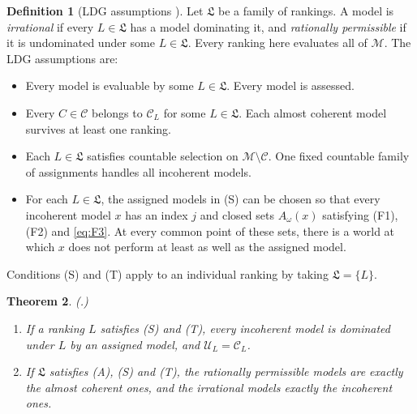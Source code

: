 \documentclass[11pt]{article}
\newtheorem{theorem}{Theorem}[section]
\theoremstyle{definition}
\newtheorem{definition}[theorem]{Definition}
\newcommand{\M}{\mathcal M}
\newcommand{\C}{\mathcal C}
\newcommand{\U}{\mathcal U}
\newcommand{\Lf}{\mathfrak L}
\begin{document}
\begin{definition}[LDG assumptions {\cite{LDG}}]\label{def:LDGassumptions}
Let $\Lf$ be a family of rankings. A model is \emph{irrational} if every $L\in\Lf$ has a model dominating it, and \emph{rationally permissible} if it is undominated under some $L\in\Lf$. Every ranking here evaluates all of $\M$. The LDG assumptions are:
\begin{itemize}[leftmargin=3.4em,labelsep=0.5em]
\item[\textbf{(E)}] Every model is evaluable by some $L\in\Lf$. Every model is assessed.
\item[\textbf{(A)}] Every $C\in\C$ belongs to $\C_L$ for some $L\in\Lf$. Each almost coherent model survives at least one ranking.
\item[\textbf{(S)}] Each $L\in\Lf$ satisfies countable selection on $\M\setminus\C$. One fixed countable family of assignments handles all incoherent models.
\begingroup\color{red}
\item[\textbf{(T)}] For each $L\in\Lf$, the assigned models in (S) can be chosen so that every incoherent model $x$ has an index $j$ and closed sets $A_\omega(x)$ satisfying (F1), (F2) and \eqref{eq:F3}. At every common point of these sets, there is a world at which $x$ does not perform at least as well as the assigned model.
\endgroup
\end{itemize}
Conditions (S) and (T) apply to an individual ranking by taking $\Lf=\{L\}$.
\end{definition}

\begin{theorem}\label{thm:LDGargument}
\emph{(\cite[Theorem~4.4, parts (a) and (d)]{LDG}.)}
\begin{enumerate}[label=(\alph*)]
\item {\color{red}If a ranking $L$ satisfies (S) and (T), every incoherent model is dominated under $L$ by an assigned model, and $\U_L=\C_L$.}
\item[(d)] If $\Lf$ satisfies (A), (S) and (T), the rationally permissible models are exactly the almost coherent ones, and the irrational models exactly the incoherent ones.
\end{enumerate}
\end{theorem}
\end{document}
